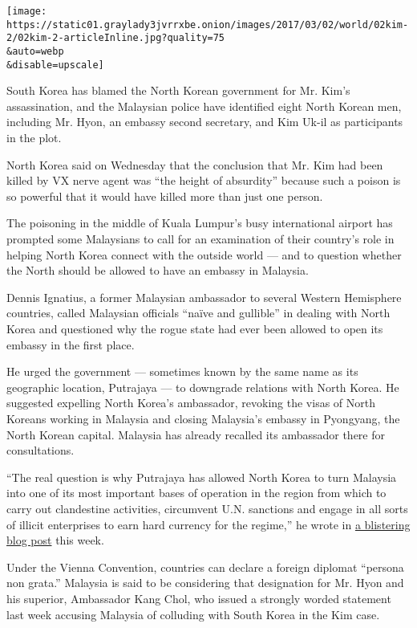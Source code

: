 \texttt{[image: https://static01.graylady3jvrrxbe.onion/images/2017/03/02/world/02kim-2/02kim-2-articleInline.jpg?quality=75\\\&auto=webp\\\&disable=upscale]}

South Korea has blamed the North Korean government for Mr. Kim's
assassination, and the Malaysian police have identified eight North
Korean men, including Mr. Hyon, an embassy second secretary, and Kim
Uk-il as participants in the plot.

North Korea said on Wednesday that the conclusion that Mr. Kim had been
killed by VX nerve agent was ``the height of absurdity'' because such a
poison is so powerful that it would have killed more than just one
person.

The poisoning in the middle of Kuala Lumpur's busy international airport
has prompted some Malaysians to call for an examination of their
country's role in helping North Korea connect with the outside world ---
and to question whether the North should be allowed to have an embassy
in Malaysia.

Dennis Ignatius, a former Malaysian ambassador to several Western
Hemisphere countries, called Malaysian officials ``naïve and gullible''
in dealing with North Korea and questioned why the rogue state had ever
been allowed to open its embassy in the first place.

He urged the government --- sometimes known by the same name as its
geographic location, Putrajaya --- to downgrade relations with North
Korea. He suggested expelling North Korea's ambassador, revoking the
visas of North Koreans working in Malaysia and closing Malaysia's
embassy in Pyongyang, the North Korean capital. Malaysia has already
recalled its ambassador there for consultations.

``The real question is why Putrajaya has allowed North Korea to turn
Malaysia into one of its most important bases of operation in the region
from which to carry out clandestine activities, circumvent U.N.
sanctions and engage in all sorts of illicit enterprises to earn hard
currency for the regime,'' he wrote in
\href{https://dennisignatius.com/2017/02/27/assassination-puts-the-spotlight-on-malaysia/}{a
blistering blog post} this week.

Under the Vienna Convention, countries can declare a foreign diplomat
``persona non grata.'' Malaysia is said to be considering that
designation for Mr. Hyon and his superior, Ambassador Kang Chol, who
issued a strongly worded statement last week accusing Malaysia of
colluding with South Korea in the Kim case.

